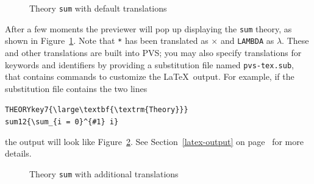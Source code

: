 \begin{figure}[ht]
\begin{center}
\begin{boxedminipage}{\textwidth}
{\small\small}
\end{boxedminipage}
\end{center}
\caption{Theory \texttt{sum} with default translations}\label{sum-plain}
\end{figure}

After a few moments the previewer will pop up displaying the \texttt{sum}
theory, as shown in Figure~\ref{sum-plain}.  Note that \texttt{*} has been
translated as $\times$ and \texttt{LAMBDA} as $\lambda$.  These and other
translations are built into PVS; you may also specify translations for
keywords and identifiers by providing a substitution file named
\texttt{pvs-tex.sub}, that contains commands to customize the \LaTeX\
output.  For example, if the substitution file contains the two lines
{\small\small
\begin{alltt}
    THEORY key 7 \verb|{\large\textbf{\textrm{Theory}}}|
    sum    1   2 \verb|{\sum_{i = 0}^{#1} i}|
\end{alltt}}
\noindent the output will look like Figure~\ref{sum-sub}.  See
Section~\ref{latex-output} on page~\pageref{latex-output} for more
details.

\begin{figure}[t]
\begin{boxedminipage}{\textwidth}
{\small\small}
\end{boxedminipage}
\caption{Theory \texttt{sum} with additional translations}\label{sum-sub}
\end{figure}

\vspace*{1in}
